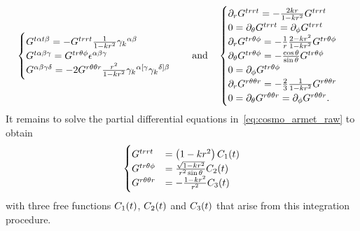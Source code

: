 \begin{align}\label{eq:cosmo_armet_raw}
	\begin{cases}
		G^{t\alpha t\beta}=-G^{trr t}\frac{1}{1-k r{}^2}{\gamma_{k}}^{\alpha\beta}\\
		G^{t\alpha\beta\gamma}=G^{tr\theta\phi}\epsilon^{\alpha\beta\gamma}\\
		G^{\alpha\beta\gamma\delta}=-2G^{r\theta\theta r}\frac{r^2}{1-k r{}^2}{\gamma_{k}}^{\alpha[\gamma}{\gamma_{k}}^{\delta]\beta}
	\end{cases} \quad \text{and} \quad \begin{cases}
		\partial_rG^{trr t}=-\frac{2kr}{1-k r{}^2}G^{trr t}\\
		0=\partial_\theta G^{trr t}=\partial_\phi G^{trr t}\\
		\partial_rG^{tr\theta\phi}=-\frac{1}{r}\frac{2-kr^2}{1-k r{}^2}G^{tr\theta\phi}\\
		\partial_\theta G^{tr\theta\phi}=-\frac{\cos{\theta}}{\sin{\theta}}G^{tr\theta\phi}\\
		0=\partial_\phi G^{tr\theta\phi}\\
		\partial_rG^{r\theta\theta r}=-\frac{2}{3}\frac{1}{1-k r{}^2}G^{r\theta\theta r}\\
		0=\partial_\theta G^{r\theta\theta r}=\partial_\phi G^{r\theta\theta r}
	\mathpunct{.}
	\end{cases}
\end{align}
It remains to solve the partial differential equations in~\eqref{eq:cosmo_armet_raw} to obtain
\begin{align}\label{eq:cosmo_armet_param_raw}
	\begin{cases}
		G^{trr t}&=\left(1-k r{}^2\right)C_1(t)\\
		G^{tr\theta\phi}&=\frac{\sqrt{1-k r{}^2}}{r^2\sin{\theta}}C_2(t)\\
		G^{r\theta\theta r}&=-\frac{1-k r{}^2}{r^2}C_3(t)
	\end{cases}
\end{align}
with three free functions $C_1(t)$, $C_2(t)$ and $C_3(t)$ that arise from this integration procedure.


